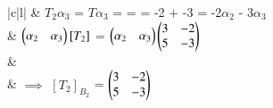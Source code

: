 \documentclass[journal,12pt]{IEEEtran}
\begin{document}
\begin{longtable}{|c|l|}
	& $T_2\alpha_3$ = $T\alpha_3$ =   =  = -2  + -3  = -2$\alpha_2$ - 3$\alpha_3$\\
	& $\begin{pmatrix}\alpha_2 & \alpha_3\end{pmatrix}[T_2]$ =  $\begin{pmatrix}\alpha_2 & \alpha_3\end{pmatrix}$$\begin{pmatrix}3&-2\\5&-3\end{pmatrix}$ \\
	& \\
	& $\implies$ $[T_2]_{B_2}$ = $\begin{pmatrix}3&-2\\5&-3\end{pmatrix}$\\
	\hline
	\caption{Finding of Basis and corresponding matrix}
    \label{table:2}
\end{longtable}
\end{document}
